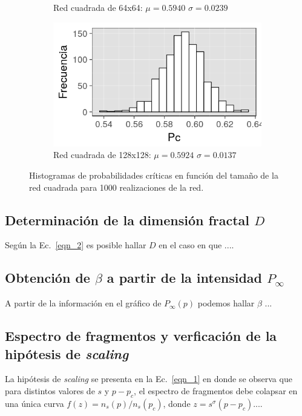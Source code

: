\documentclass[%
 reprint,
 amsmath,amssymb,
 aps,
spanish]{revtex4-1}
\begin{document}
\begin{figure}[h]
\begin{subfigure}{.25\textwidth}
  \caption{Red cuadrada de 64x64: $\mu=0.5940$ $\sigma=0.0239$}
  \label{fig:1ahist}
\end{subfigure}%
\begin{subfigure}{.25\textwidth}
  \centering
  \includegraphics[width=.9\linewidth]{ej1a/hist128x128}
  \caption{Red cuadrada de 128x128: $\mu=0.5924$ $\sigma=0.0137$}
  \label{fig:1ahist}
\end{subfigure}
\caption{Histogramas de probabilidades críticas en función del tamaño de la red cuadrada para 1000 realizaciones de la red.}
\label{fig:histograma_red_cuadrada_1a}
\end{figure}

\subsection{\label{D} Determinaci\'on de la dimensi\'on fractal $D$ }

Seg\'un la Ec.~\ref{eqn_2} es posible hallar $D$ en el caso en que ....

\subsection{\label{P} Obtenci\'on de $\beta$ a partir de la intensidad $P_\infty$}

A partir de la informaci\'on en el gr\'afico de $P_\infty(p)$ podemos hallar $\beta$ ...

\subsection{\label{S} Espectro de fragmentos y verficaci\'on de la hip\'otesis de \emph{scaling} }

La hip\'otesis de \emph{scaling} se presenta en la Ec.~\ref{eqn_1} en donde se observa que para distintos valores de $s$ y $p-p_c$, el espectro de fragmentos debe colapsar en una \'unica curva $f(z)=n_s(p)/n_s(p_c)$, donde $z=s^\sigma(p-p_c)$.... 
\end{document}
